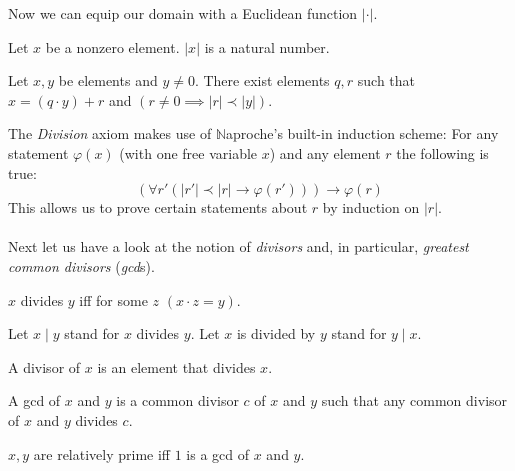 \documentclass{article}
\begin{document}
  Now we can equip our domain with a Euclidean function $|\cdot|$.

  \begin{forthel}
    \begin{signature}\label{EucSort}
      Let $x$ be a nonzero element. $|x|$ is a natural number.
    \end{signature}

    \begin{axiom}\label{Division}
      Let $x,y$ be elements and $y \neq 0$.
      There exist elements $q,r$ such that $x = (q \cdot y) + r$ and
      $(r \neq 0 \implies |r| \prec |y|)$.
    \end{axiom}
  \end{forthel}

  The \textit{Division} axiom makes use of {$\mathbb{N}$aproche's} built-in
  induction scheme: For any statement $\varphi(x)$ (with one free variable $x$)
  and any element $r$ the following is true:
  \[ (\forall r' (|r'| \prec |r| \rightarrow \varphi(r'))) \rightarrow \varphi(r) \]
  This allows us to prove certain statements about $r$ by induction on $|r|$.

  \paragraph{} Next let us have a look at the notion of \textit{divisors} and,
  in particular, \textit{greatest common divisors} (\textit{gcd}s).

  \begin{forthel}
    \begin{definition}\label{DefDiv}
      $x$ divides $y$ iff for some $z$ $(x \cdot z = y)$.
    \end{definition}

    Let $x \mid y$ stand for $x$ divides $y$.
    Let $x$ is divided by $y$ stand for $y \mid x$.

    \begin{definition}\label{DefDvs}
      A divisor of $x$ is an element that divides $x$.
    \end{definition}

    \begin{definition}\label{DefGCD}
      A gcd of $x$ and $y$ is a common divisor $c$ of $x$ and $y$ such that any
      common divisor of $x$ and $y$ divides $c$.
    \end{definition}

    \begin{definition}\label{DefRel}
      $x,y$ are relatively prime iff $1$ is a gcd of $x$ and $y$.
    \end{definition}
  \end{forthel}
\end{document}
